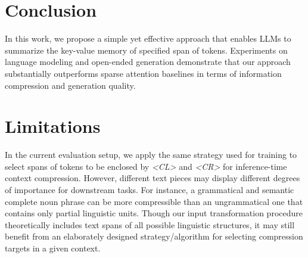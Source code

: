 \section{Conclusion}
In this work, we propose a simple yet effective approach that enables LLMs to summarize the key-value memory of specified span of tokens. Experiments on language modeling and open-ended generation demonstrate that our approach substantially outperforms sparse attention baselines in terms of 
information compression and generation quality.

\section*{Limitations}
In the current evaluation setup, we apply the same strategy used for training to select spans of tokens to be enclosed by \textit{<CL>} and \textit{<CR>} for inference-time context compression. However, different text pieces may display different degrees of importance for downstream tasks. For instance, a grammatical and semantic complete noun phrase can be more compressible than an ungrammatical one that contains only partial linguistic units. Though our input transformation procedure theoretically includes  text spans of all possible linguistic structures, it may still 
benefit from an elaborately designed strategy/algorithm for selecting compression targets in a given context.